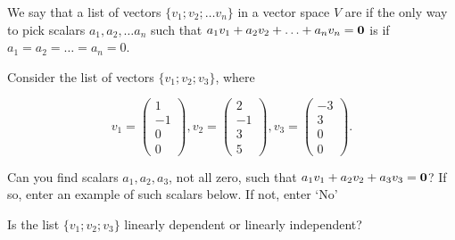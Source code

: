 \edXsolution{ 
}


\endedxproblem


\endedxvertical





We say that a list of vectors $\{v_1; v_2; \ldots v_n\}$ in a vector space $V$ are 
{} if the only way to pick scalars $a_1, a_2, \ldots a_n$ such that
$a_1v_1 + a_2v_2 + \ldots + a_nv_n = \mathbf{0}$ is if $a_1 = a_2 = \ldots = a_n = 0$.  



\endedxtext



Consider the list of vectors $\{v_1; v_2; v_3\}$, where

\[v_1 = \left(\begin{array}{c} 1 \\ -1  \\ 0 \\ 0 \end{array} \right), 
v_2 = \left(\begin{array}{c} 2 \\ -1  \\ 3 \\ 5 \end{array} \right),  
v_3 = \left(\begin{array}{c} -3 \\ 3  \\ 0 \\ 0 \end{array} \right). \]

Can you find scalars $a_1, a_2, a_3$, not all zero, such that 
$a_1v_1 + a_2 v_2 + a_3 v_3 = \mathbf{0}$?  If so, enter an example of such scalars below.
If not, enter `No'  




Is the list $\{v_1; v_2; v_3\}$ linearly dependent or linearly independent?  



\edXsolution{ 
}


\endedxproblem





